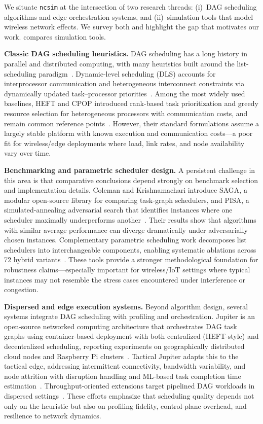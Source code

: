 \documentclass[conference]{IEEEtran}
\newcommand{\ncsim}{\texttt{ncsim}}
\begin{document}
We situate \ncsim{} at the intersection of two research threads: (i)~DAG
scheduling algorithms and edge orchestration systems, and (ii)~simulation
tools that model wireless network effects.  We survey both and highlight the
gap that motivates our work.   compares simulation tools.

\textbf{Classic DAG scheduling heuristics.}
DAG scheduling has a long history in parallel and distributed computing,
with many heuristics built around the list-scheduling
paradigm~\cite{Adam1974ListSchedules,KwokAhmad1999Survey}.
Dynamic-level scheduling (DLS) accounts for interprocessor communication and
heterogeneous interconnect constraints via dynamically updated task--processor
priorities~\cite{Sih1993DLS}.
Among the most widely used baselines, HEFT and CPOP introduced rank-based
task prioritization and greedy resource selection for heterogeneous processors
with communication costs, and remain common reference points~\cite{heft}.
However, their standard formulations assume a largely stable platform with
known execution and communication costs---a poor fit for wireless/edge
deployments where load, link rates, and node availability vary over time.

\textbf{Benchmarking and parametric scheduler design.}
A persistent challenge in this area is that comparative conclusions depend
strongly on benchmark selection and implementation details.
Coleman and Krishnamachari introduce SAGA, a modular open-source library for
comparing task-graph schedulers, and PISA, a simulated-annealing adversarial
search that identifies instances where one scheduler maximally underperforms
another~\cite{Coleman2024PISA,SAGARepo}.
Their results show that algorithms with similar average performance can
diverge dramatically under adversarially chosen instances.
Complementary parametric scheduling work decomposes list schedulers into
interchangeable components, enabling systematic ablations across 72 hybrid
variants~\cite{Coleman2024Parametric}.
These tools provide a stronger methodological foundation for robustness
claims---especially important for wireless/IoT settings where typical
instances may not resemble the stress cases encountered under interference
or congestion.

\textbf{Dispersed and edge execution systems.}
Beyond algorithm design, several systems integrate DAG scheduling with
profiling and orchestration.
Jupiter is an open-source networked computing architecture that orchestrates
DAG task graphs using container-based deployment with both centralized
(HEFT-style) and decentralized scheduling, reporting experiments on
geographically distributed cloud nodes and Raspberry Pi
clusters~\cite{Ghosh2021Jupiter}.
Tactical Jupiter adapts this to the tactical edge, addressing intermittent
connectivity, bandwidth variability, and node attrition with disruption
handling and ML-based task completion time
estimation~\cite{Poylisher2021TacticalJupiter}.
Throughput-oriented extensions target pipelined DAG workloads in dispersed
settings~\cite{Zhao2021TPHEFT}.
These efforts emphasize that scheduling quality depends not only on the
heuristic but also on profiling fidelity, control-plane overhead, and
resilience to network dynamics.
\end{document}
